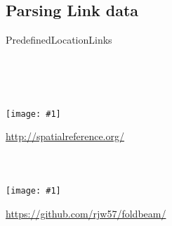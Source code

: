 \documentclass[aspectratio=169]{beamer}
\newcommand{\wideimage}[1]{%
  \begin{frame}
    \centering
    \texttt{[image: \#1]}
    \\
  \end{frame}
}
\begin{document}
\subsection{Parsing Link data}
\begin{frame}
  \centering\Huge
  PredefinedLocationLinks
  \\
\end{frame}

\begin{frame}
  \inputminted{xml}{PredefinedLocationLinks/structure.xml}
\end{frame}

\begin{frame}
  \inputminted{xml}{PredefinedLocationLinks/location.xml}
\end{frame}

\begin{frame}
  \inputminted{python}{PredefinedLocationLinks/structure.py}
\end{frame}

\begin{frame}
  \inputminted{python}{PredefinedLocationLinks/structure_out.py}
\end{frame}

\begin{frame}
  \inputminted{python}{wgs84-links.py}
\end{frame}

\wideimage{img/wgs84-links.pdf}

\begin{frame}
  \begin{centering}
    \Large\url{http://spatialreference.org/}
    \\
  \end{centering}
  \vspace{\baselineskip}
  \inputminted[lastline=7]{python}{bng-links.py}
\end{frame}

\begin{frame}
  \inputminted[firstline=9, lastline=19]{python}{bng-links.py}
\end{frame}

\begin{frame}
  \inputminted[firstline=21, lastline=31]{python}{bng-links.py}
\end{frame}

\wideimage{img/bng-links.pdf}

\begin{frame}
  \centering
  \parbox{0.6\textwidth}{%
    \url{https://github.com/rjw57/foldbeam/}
    \\
    \vspace{2\baselineskip}
    \inputminted{console}{foldbeam-render.sh}
  }
  \\
\end{frame}
\end{document}
